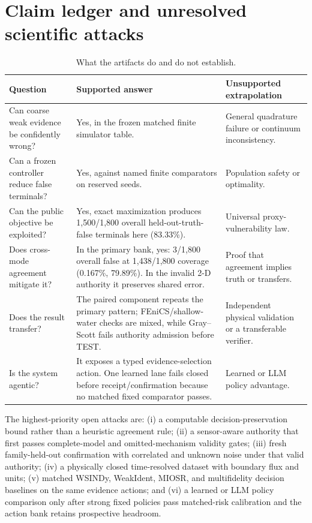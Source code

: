 \documentclass{article}
\begin{document}
\section{Claim ledger and unresolved scientific attacks}

\begin{table}[ht]
\centering\small
\caption{What the artifacts do and do not establish.}
\begin{tabular}{>{\raggedright\arraybackslash}p{.29\linewidth}>{\raggedright\arraybackslash}p{.30\linewidth}>{\raggedright\arraybackslash}p{.31\linewidth}}
\toprule
Question & Supported answer & Unsupported extrapolation \\
\midrule
Can coarse weak evidence be confidently wrong? & Yes, in the frozen matched finite simulator table. & General quadrature failure or continuum inconsistency. \\
Can a frozen controller reduce false terminals? & Yes, against named finite comparators on reserved seeds. & Population safety or optimality. \\
Can the public objective be exploited? & Yes, exact maximization produces 1,500/1,800 overall held-out-truth-false terminals here (83.33\%). & Universal proxy-vulnerability law. \\
Does cross-mode agreement mitigate it? & In the primary bank, yes: 3/1,800 overall false at 1,438/1,800 coverage (0.167\%, 79.89\%). In the invalid 2-D authority it preserves shared error. & Proof that agreement implies truth or transfers. \\
Does the result transfer? & The paired component repeats the primary pattern; FEniCS/shallow-water checks are mixed, while Gray--Scott fails authority admission before TEST. & Independent physical validation or a transferable verifier. \\
Is the system agentic? & It exposes a typed evidence-selection action. One learned lane fails closed before receipt/confirmation because no matched fixed comparator passes. & Learned or LLM policy advantage. \\
\bottomrule
\end{tabular}
\end{table}

The highest-priority open attacks are: (i) a computable decision-preservation bound rather than a
heuristic agreement rule; (ii) a sensor-aware authority that first passes complete-model and
omitted-mechanism validity gates; (iii) fresh family-held-out confirmation with correlated and
unknown noise under that valid authority; (iv) a physically closed time-resolved dataset with
boundary flux and units; (v) matched WSINDy, WeakIdent, MIOSR, and multifidelity decision baselines
on the same evidence actions; and (vi) a learned or LLM policy comparison only after strong fixed
policies pass matched-risk calibration and the action bank retains prospective headroom.
\end{document}
